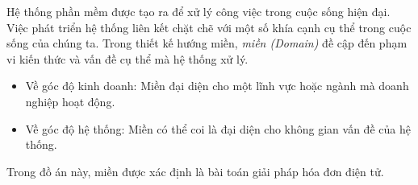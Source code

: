 
Hệ thống phần mềm được tạo ra để xử lý công việc trong cuộc sống hiện đại. Việc phát triển hệ thống liên kết chặt chẽ với một số khía cạnh cụ thể trong cuộc sống của chúng ta. Trong thiết kế hướng miền, \emph{miền (Domain)} đề cập đến phạm vi kiến thức và vấn đề cụ thể mà hệ thống xử lý.

\begin{itemize}

\item Về góc độ kinh doanh: Miền đại diện cho một lĩnh vực hoặc ngành mà doanh nghiệp hoạt động.

\item Về góc độ hệ thống: Miền có thể coi là đại diện cho không gian vấn đề của hệ thống.

\end{itemize}

\begin{example} Trong đồ án này, miền được xác định là bài toán giải pháp hóa đơn điện tử. \end{example}